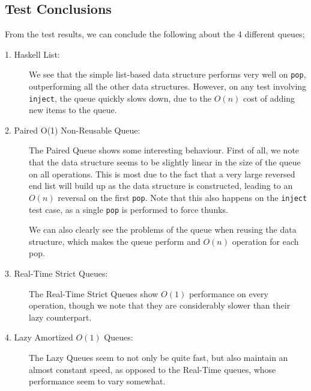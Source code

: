 \subsection{Test Conclusions}
 
From the test results, we can conclude the following about the 4 different queues;

\begin{description}
\item[1. Haskell List:]
We see that the simple list-based data structure performs very well on \texttt{pop}, outperforming all the other data structures.
However, on any test involving \texttt{inject}, the queue quickly slows down, due to the $O(n)$ cost of adding new items to the queue. 

\item[2. Paired O(1) Non-Reusable Queue:]
The Paired Queue shows some interesting behaviour.
First of all, we note that the data structure seems to be slightly linear in the size of the queue on all operations. This is most due to the fact that a very large reversed end list will build up as the data structure is constructed, leading to an $O(n)$ reversal on the first \texttt{pop}. Note that this also happens on the \texttt{inject} test case, as a single \texttt{pop} is performed to force thunks.

We can also clearly see the problems of the queue when reusing the data structure, which makes the queue perform and $O(n)$ operation for each pop.

\item[3. Real-Time Strict Queues:] 
The Real-Time Strict Queues show $O(1)$ performance on every operation, though we note that they are considerably slower than their lazy counterpart.

\item[4. Lazy Amortized $O(1)$ Queues:]
The Lazy Queues seem to not only be quite fast, but also maintain an almost constant speed, as opposed to the Real-Time queues, whose performance seem to vary somewhat.
\end{description}
